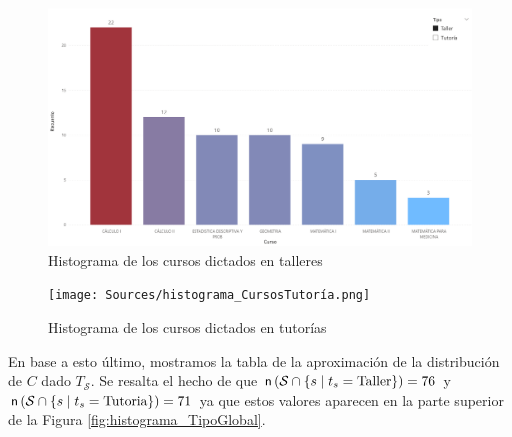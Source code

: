 \documentclass[11pt,a4paper]{book}
\theoremstyle{definition}%
\newcommand{\card}[1]{\text{\textsf{n}}\left( #1 \right)}
\begin{document}
                \begin{figure}[H]
                    \centering
                    \includegraphics[width=1\textwidth]{Sources/histograma_CursosTaller.png}
                    \caption{Histograma de los cursos dictados en talleres}
                    \label{fig:histograma_CursosTaller}
                \end{figure}
                \begin{figure}[H]
                    \centering
                    \texttt{[image: Sources/histograma\_CursosTutoría.png]}
                    \caption{Histograma de los cursos dictados en tutorías}
                    \label{fig:histograma_CursosTutoría}
                \end{figure}
                En base a esto último, mostramos la tabla de la aproximación de la distribución de $C$ dado $T_\mathcal{S}$. Se resalta el hecho de que $\card{\mathcal{S}\cap\{s\mid t_s=\text{Taller}\}}=76$ y $\card{\mathcal{S}\cap\{s\mid t_s=\text{Tutoria}\}}=71$ ya que estos valores aparecen en la parte superior de la Figura \ref{fig:histograma_TipoGlobal}.
\end{document}
